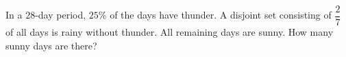 In a $28$-day period, $25\%$ of the days have thunder. A disjoint set consisting of $\dfrac{2}{7}$ of all days is rainy without thunder. All remaining days are sunny. How many sunny days are there?
